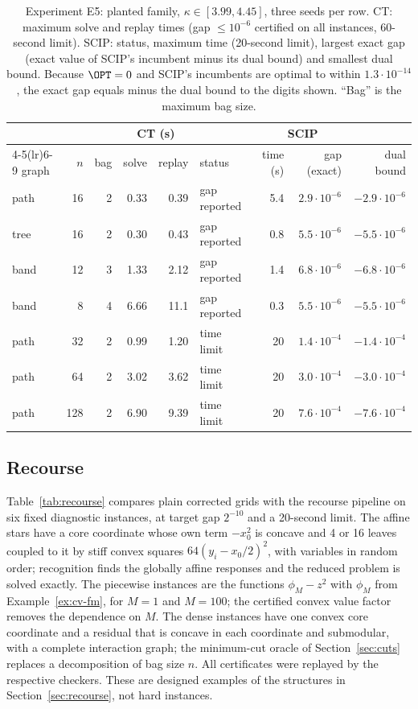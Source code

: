 \begin{table}[t]
\centering\small
\setlength{\tabcolsep}{4pt}
\caption{Experiment E5: planted family, $\kappa\in[3.99,4.45]$, three seeds per
row. CT: maximum solve and replay times (gap $\le10^{-6}$ certified on all
instances, 60-second limit). SCIP: status, maximum time (20-second limit),
largest exact gap (exact value of SCIP's incumbent minus its dual bound) and
smallest dual bound. Because $\OPT=0$ and SCIP's incumbents are optimal to
within $1.3\cdot10^{-14}$, the exact gap equals minus the dual bound to the
digits shown. ``Bag'' is the maximum bag size.}\label{tab:scip}
\begin{tabular}{lrrrrlrrr}
\toprule
&&&\multicolumn{2}{c}{CT (s)}&\multicolumn{4}{c}{SCIP}\\
\cmidrule(lr){4-5}\cmidrule(lr){6-9}
graph & $n$ & bag & solve & replay & status & time (s) & gap (exact) & dual bound\\
\midrule
path & 16 & 2 & 0.33 & 0.39 & gap reported & 5.4 & $2.9\cdot10^{-6}$ & $-2.9\cdot10^{-6}$\\
tree & 16 & 2 & 0.30 & 0.43 & gap reported & 0.8 & $5.5\cdot10^{-6}$ & $-5.5\cdot10^{-6}$\\
band & 12 & 3 & 1.33 & 2.12 & gap reported & 1.4 & $6.8\cdot10^{-6}$ & $-6.8\cdot10^{-6}$\\
band & 8 & 4 & 6.66 & 11.1 & gap reported & 0.3 & $5.5\cdot10^{-6}$ & $-5.5\cdot10^{-6}$\\
path & 32 & 2 & 0.99 & 1.20 & time limit & 20 & $1.4\cdot10^{-4}$ & $-1.4\cdot10^{-4}$\\
path & 64 & 2 & 3.02 & 3.62 & time limit & 20 & $3.0\cdot10^{-4}$ & $-3.0\cdot10^{-4}$\\
path & 128 & 2 & 6.90 & 9.39 & time limit & 20 & $7.6\cdot10^{-4}$ & $-7.6\cdot10^{-4}$\\
\bottomrule
\end{tabular}
\end{table}

\subsection{Recourse}\label{sec:comp-recourse}
Table~\ref{tab:recourse} compares plain corrected grids with the recourse
pipeline on six fixed diagnostic instances, at target gap $2^{-10}$ and a
20-second limit. The affine stars have a core coordinate whose own term
$-x_0^2$ is concave and 4 or 16 leaves coupled to it by stiff convex squares
$64(y_i-x_0/2)^2$, with variables in random order; recognition finds the
globally affine responses and the reduced problem is solved exactly. The
piecewise instances are the functions $\phi_M-z^2$ with $\phi_M$ from
Example~\ref{ex:cv-fm}, for $M=1$ and $M=100$; the certified convex value factor
removes the dependence on $M$. The dense instances have one convex core
coordinate and a residual that is concave in each coordinate and submodular,
with a complete interaction graph; the minimum-cut oracle of
Section~\ref{sec:cuts} replaces a decomposition of bag size $n$. All
certificates were replayed by the respective checkers. These are designed
examples of the structures in Section~\ref{sec:recourse}, not hard instances.

